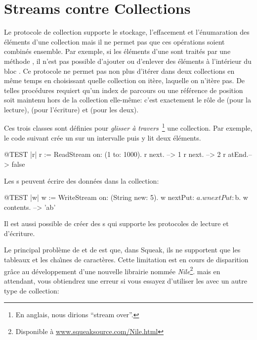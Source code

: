\documentclass[a4paper,10pt,twoside]{book}
\begin{document}
\section{Streams contre Collections}

Le protocole de collection supporte le stockage, l'effacement et l'\'enumaration
des \'el\'ements d'une collection mais il ne permet pas que ces op\'erations
soient combin\'es ensemble. Par exemple, si les \'el\'ements d'une 
 sont trait\'es par une m\'ethode , il n'est pas possible d'ajouter ou d'enlever des \'el\'ements
\`a l'int\'erieur du bloc .
Ce protocole ne permet pas non plus d'it\'erer dans deux collections
en m\^eme temps en choisissant quelle collection on itère, laquelle on n'itère pas.
De telles proc\'edures requiert qu'un index de parcours ou une r\'ef\'erence
de position soit maintenu hors de la collection elle-m\^eme:
c'est exactement le r\^ole de  
 (pour la lecture),  (pour l'\'ecriture) et  (pour les deux).

Ces trois classes sont d\'efinies pour \emph{glisser à travers}~\footnote{En anglais, nous dirions ``stream over''.} une collection.
Par exemple, le code suivant cr\'ee un \stream sur un intervalle puis y lit deux \'el\'ements.
\begin{code}{@TEST |r|}
r := ReadStream on: (1 to: 1000).
r next.   --> 1
r next.   --> 2
r atEnd.--> false
\end{code}

Les s peuvent \'ecrire des donn\'ees dans la collection:
\begin{code}{@TEST |w|}
w := WriteStream on: (String new: 5).
w nextPut: $a.
w nextPut: $b.
w contents. -->  'ab'
\end{code}

Il est aussi possible de cr\'eer des s qui supporte
les protocoles de lecture et d'\'ecriture.

Le principal probl\`eme de  et de 
est que, dans Squeak, ils ne supportent que les tableaux et les 
cha\^{\i}nes de caract\`eres. Cette limitation est en cours de
disparition gr\^ace au d\'eveloppement d'une nouvelle librairie
nomm\'ee \emph{Nile}\footnote{Disponible \`a \url{www.squeaksource.com/Nile.html}}. mais en attendant, vous obtiendrez une erreur
si vous essayez d'utiliser les \streams avec un autre type de collection:
\end{document}
